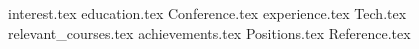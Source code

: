 \documentclass[11pt, a4paper]{awesome-cv}
\newcommand*{\sectiondir}{resume/}
\begin{document}
\makecvheader

{interest.tex}
{education.tex}
{Conference.tex}
{experience.tex}
{Tech.tex}
{relevant_courses.tex}
{achievements.tex}
{Positions.tex}
{Reference.tex}
\end{document}
